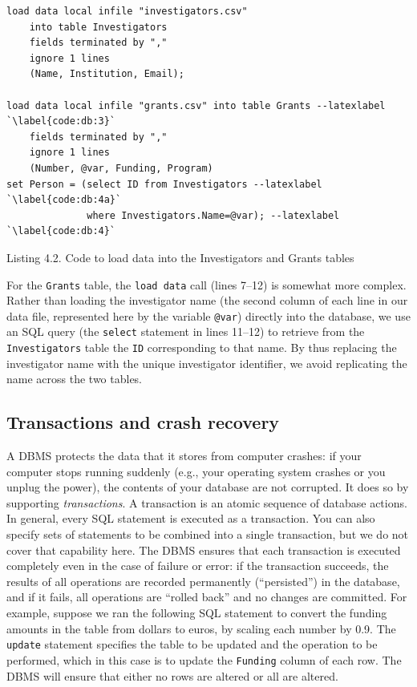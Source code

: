 \documentclass[]{krantz}
\begin{document}
\hypertarget{fig:db:load}{\label{fig:db:load}}
\begin{verbatim}
load data local infile "investigators.csv"
    into table Investigators
    fields terminated by ","
    ignore 1 lines
    (Name, Institution, Email);

load data local infile "grants.csv" into table Grants --latexlabel `\label{code:db:3}`
    fields terminated by ","
    ignore 1 lines
    (Number, @var, Funding, Program)
set Person = (select ID from Investigators --latexlabel `\label{code:db:4a}`
              where Investigators.Name=@var); --latexlabel `\label{code:db:4}`
\end{verbatim}

Listing 4.2. Code to load data into the Investigators and Grants tables

For the \texttt{Grants} table, the \texttt{load\ data} call (lines
7--12) is somewhat more complex. Rather than loading the investigator
name (the second column of each line in our data file, represented here
by the variable \texttt{@var}) directly into the database, we use an SQL
query (the \texttt{select} statement in lines 11--12) to retrieve from
the \texttt{Investigators} table the \texttt{ID} corresponding to that
name. By thus replacing the investigator name with the unique
investigator identifier, we avoid replicating the name across the two
tables.

\subsection{Transactions and crash
recovery}\label{transactions-and-crash-recovery}

A DBMS protects the data that it stores from computer crashes: if your
computer stops running suddenly (e.g., your operating system crashes or
you unplug the power), the contents of your database are not corrupted.
It does so by supporting \emph{transactions}. A transaction is an atomic
sequence of database actions. In general, every SQL statement is
executed as a transaction. You can also specify sets of statements to be
combined into a single transaction, but we do not cover that capability
here. The DBMS ensures that each transaction is executed completely even
in the case of failure or error: if the transaction succeeds, the
results of all operations are recorded permanently (``persisted'') in
the database, and if it fails, all operations are ``rolled back'' and no
changes are committed. For example, suppose we ran the following SQL
statement to convert the funding amounts in the table from dollars to
euros, by scaling each number by 0.9. The \texttt{update} statement
specifies the table to be updated and the operation to be performed,
which in this case is to update the \texttt{Funding} column of each row.
The DBMS will ensure that either no rows are altered or all are altered.
\end{document}
